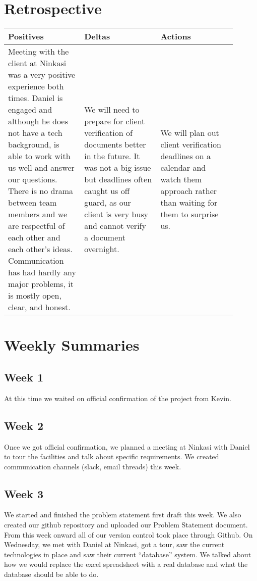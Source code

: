 \documentclass[draftclsnofoot,onecolumn,letterpaper,10pt,compsoc]{IEEEtran}
\begin{document}
\section{Retrospective}
\begin{center}
    \begin{tabular}{|p{0.3\linewidth}|p{0.3\linewidth}|p{0.3\linewidth}|}
        \hline
             Positives & Deltas & Actions \\
        \hline
            Meeting with the client at Ninkasi was a very positive experience both times.
						Daniel is engaged and although he does not have a tech background, is able to work with us well and answer our questions.
						There is no drama between team members and we are respectful of each other and each other’s ideas.
						Communication has had hardly any major problems, it is mostly open, clear, and honest.
            &
            We will need to prepare for client verification of documents better in the future.
						It was not a big issue but deadlines often caught us off guard, as our client is very busy and cannot verify a document overnight.
            &
            We will plan out client verification deadlines on a calendar and watch them approach rather than waiting for them to surprise us.
            \\
            \hline
    \end{tabular}
\end{center}

\section{Weekly Summaries}
\subsection{Week 1}
At this time we waited on official confirmation of the project from Kevin.
\subsection{Week 2}
Once we got official confirmation, we planned a meeting at Ninkasi with Daniel to tour the facilities and talk about specific requirements.
We created communication channels (slack, email threads) this week.
\subsection{Week 3}
We started and finished the problem statement first draft this week. We also created our github repository and uploaded our Problem Statement document.
From this week onward all of our version control took place through Github. On Wednesday, we met with Daniel at Ninkasi, got a tour, saw the current technologies in place and saw their current “database” system.
We talked about how we would replace the excel spreadsheet with a real database and what the database should be able to do.
\end{document}
